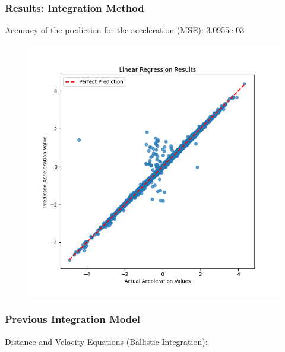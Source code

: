 \begin{frame}
  \frametitle{Results: Integration Method}
  Accuracy of the prediction for the acceleration (MSE): 3.0955e-03
  \begin{figure}
      \centering
        \includegraphics[width=0.6 \textwidth]{figures/graphs/Linear Regression Results.png}
  \end{figure}
\end{frame}



\begin{frame}
  \frametitle{Previous Integration Model }
    Distance and Velocity Equations (Ballistic Integration):
\end{frame}



